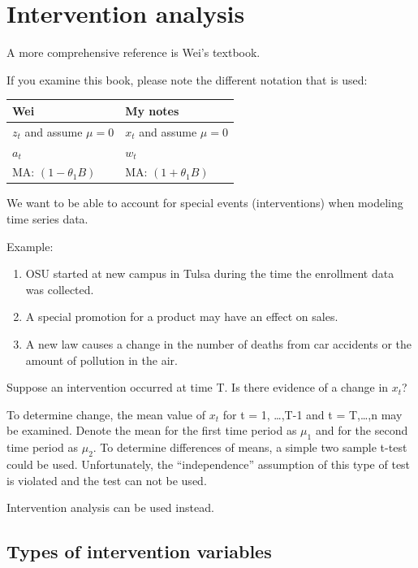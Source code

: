 \documentclass[
]{book}
\providecommand{\tightlist}{%
  \setlength{\itemsep}{0pt}\setlength{\parskip}{0pt}}
\theoremstyle{definition}
\theoremstyle{definition}
\theoremstyle{definition}
\theoremstyle{definition}
\theoremstyle{remark}
\begin{document}
\hypertarget{intervention-analysis}{%
\section{Intervention analysis}\label{intervention-analysis}}

A more comprehensive reference is Wei's textbook.

If you examine this book, please note the different notation that is used:

\begin{longtable}[]{@{}ll@{}}
\toprule()
Wei & My notes \\
\midrule()
\endhead
\(z_t\) and assume \(\mu=0\) & \(x_t\) and assume \(\mu=0\) \\
\(a_t\) & \(w_t\) \\
MA: \((1-\theta_1B)\) & MA: \((1+\theta_1B)\) \\
\bottomrule()
\end{longtable}

We want to be able to account for special events (interventions) when modeling time series data.

Example:

\begin{enumerate}
\def\labelenumi{\arabic{enumi}.}
\tightlist
\item
  OSU started at new campus in Tulsa during the time the enrollment data was collected.
\item
  A special promotion for a product may have an effect on sales.\\
\item
  A new law causes a change in the number of deaths from car accidents or the amount of pollution in the air.
\end{enumerate}

Suppose an intervention occurred at time T. Is there evidence of a change in \(x_t\)?

To determine change, the mean value of \(x_t\) for t = 1, \ldots,T-1 and t = T,\ldots,n may be examined. Denote the mean for the first time period as \(\mu_1\) and for the second time period as \(\mu_2\). To determine differences of means, a simple two sample t-test could be used. Unfortunately, the ``independence'' assumption of this type of test is violated and the test can not be used.

Intervention analysis can be used instead.

\hypertarget{types-of-intervention-variables}{%
\subsection{Types of intervention variables}\label{types-of-intervention-variables}}
\end{document}
